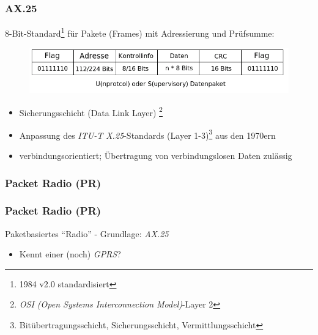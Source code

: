\begin{frame}
  \frametitle{AX.25}

  8-Bit-Standard\footnote{1984 v2.0 standardisiert} für Pakete (Frames) mit Adressierung und Prüfsumme:

  \begin{center}
    \begin{figure}
      \includegraphics[width=1\textwidth,height=.4\textheight,keepaspectratio]{e16/Ax25-US-Paket.png}
    \end{figure}
  \end{center}

  \begin{itemize}
    \item Sicherungsschicht (Data Link Layer)
      \footnote{\emph{OSI (Open Systems Interconnection Model)}-Layer 2}
    \item Anpassung des  \emph{ITU-T X.25}-Standards (Layer
      1-3)\footnote{Bitübertragungsschicht, Sicherungsschicht,
      Vermittlungsschicht} aus den 1970ern
    \item verbindungsorientiert; Übertragung von verbindungslosen Daten zulässig
  \end{itemize}

\end{frame}

\subsubsection {Packet Radio (PR)}

\begin{frame}
  \frametitle{Packet Radio (PR)}

  Paketbasiertes ``Radio'' - Grundlage: \emph{AX.25}

  \begin{itemize}
    \item Kennt einer (noch) \emph{GPRS}?
  \end{itemize}

\end{frame}

